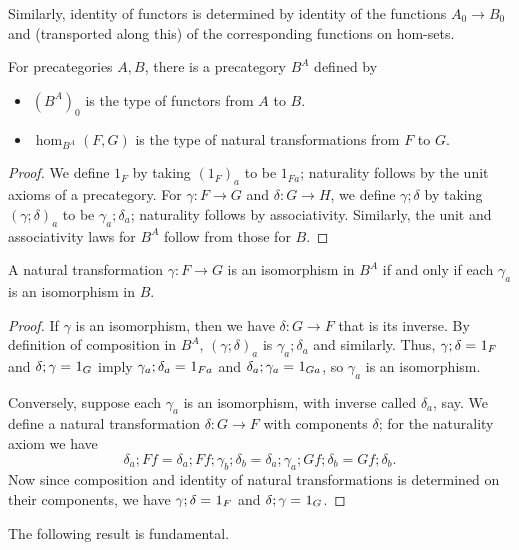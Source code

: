 Similarly, identity of functors is determined by identity of the functions $A_0\to B_0$ and (transported along this) of the corresponding functions on hom-sets.

\begin{defn}\label{ct:functor-precat}
  For precategories $A,B$, there is a precategory $B^A$ defined by
  \begin{itemize}
  \item $(B^A)_0$ is the type of functors from $A$ to $B$.
  \item $\hom_{B^A}(F,G)$ is the type of natural transformations from $F$ to $G$.
  \end{itemize}
\end{defn}
\begin{proof}
  We define $1_F$ by taking $(1_F)_a$ to be $1_{Fa}$; naturality follows by the unit axioms of a precategory.  For $\gamma:F\to G$ and $\delta:G\to H$, we define $\gamma;\delta$ by taking $(\gamma;\delta)_a$ to be $\gamma_a;\delta_a$; naturality follows by associativity.
  Similarly, the unit and associativity laws for $B^A$ follow from those for $B$.
\end{proof}

\begin{lem}\label{ct:natiso}
  A natural transformation $\gamma:F\to G$ is an isomorphism in $B^A$ if and only if each $\gamma_a$ is an isomorphism in $B$.
\end{lem}
\begin{proof}
  If $\gamma$ is an isomorphism, then we have $\delta:G\to F$ that is its inverse.  By definition of composition in $B^A$, $(\gamma;\delta)_a$ is $\gamma_a;\delta_a$ and similarly.  Thus, $\gamma;\delta =_{} 1_F$ and $\delta;\gamma =_{} 1_G$ imply $\gamma_a;\delta_a =_{} 1_{Fa}$ and $\delta_a;\gamma_a =_{} 1_{Ga}$, so $\gamma_a$ is an isomorphism.

  Conversely, suppose each $\gamma_a$ is an isomorphism, with inverse called $\delta_a$, say.  We define a natural transformation $\delta:G\to F$ with components $\delta$; for the naturality axiom we have
  \[ \delta_a;Ff = \delta_a;Ff;\gamma_b;\delta_b = \delta_a;\gamma_a;Gf;\delta_b = Gf;\delta_b. \]
  Now since composition and identity of natural transformations is determined on their components, we have $\gamma;\delta =_{} 1_F$ and $\delta;\gamma =_{} 1_G$.
\end{proof}

The following result is fundamental.


